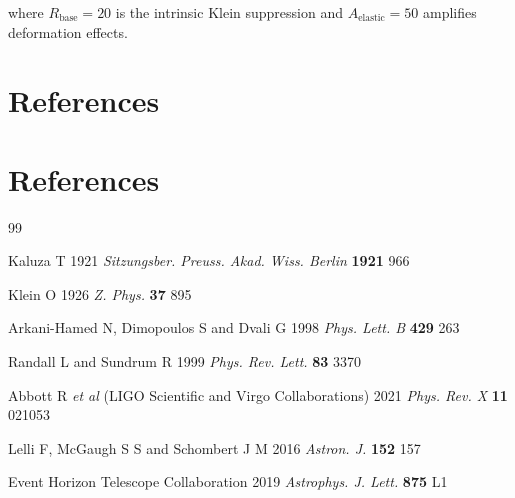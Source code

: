 \documentclass[12pt]{iopart}
\begin{document}
where $R_{\text{base}} = 20$ is the intrinsic Klein suppression and $A_{\text{elastic}} = 50$ amplifies deformation effects.

\section*{References}

\section*{References}
\providecommand{\newblock}{}
\begin{thebibliography}{99}

Kaluza T 1921 \textit{Sitzungsber. Preuss. Akad. Wiss. Berlin} \textbf{1921} 966

Klein O 1926 \textit{Z. Phys.} \textbf{37} 895

Arkani-Hamed N, Dimopoulos S and Dvali G 1998 \textit{Phys. Lett. B} \textbf{429} 263

Randall L and Sundrum R 1999 \textit{Phys. Rev. Lett.} \textbf{83} 3370

Abbott R \textit{et al} (LIGO Scientific and Virgo Collaborations) 2021 \textit{Phys. Rev. X} \textbf{11} 021053

Lelli F, McGaugh S S and Schombert J M 2016 \textit{Astron. J.} \textbf{152} 157

Event Horizon Telescope Collaboration 2019 \textit{Astrophys. J. Lett.} \textbf{875} L1

\end{thebibliography}
\end{document}
